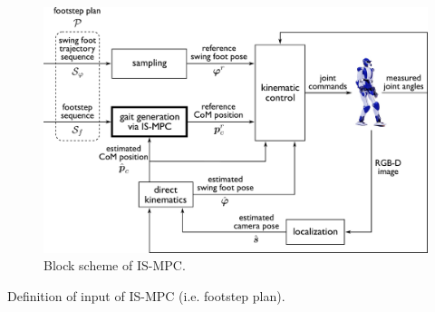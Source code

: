 \begin{figure}
    \centering
    \includegraphics[width=\textwidth]{figures/BlockSchemeISMPC.pdf}
    \caption{Block scheme of IS-MPC.}
    \label{fig:blockschemeISMPC}
\end{figure}

Definition of input of IS-MPC (i.e. footstep plan).


